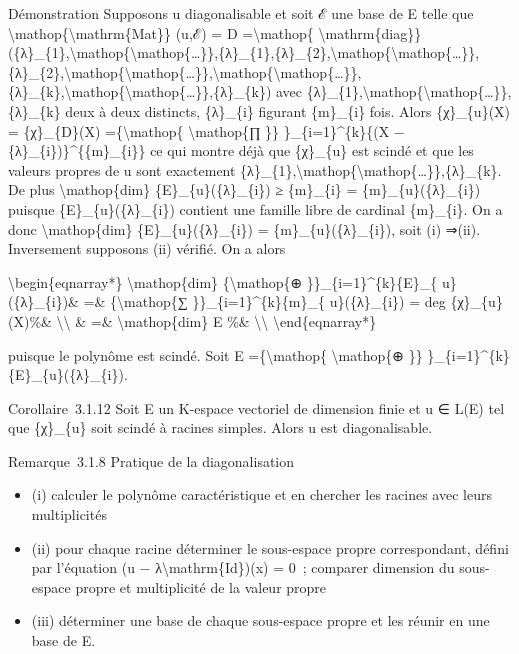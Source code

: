 \documentclass[]{article}
\begin{document}
Démonstration Supposons u diagonalisable et soit ℰ une base de E telle
que \textbackslash{}mathop\{\textbackslash{}mathrm\{Mat\}\} (u,ℰ) = D
=\textbackslash{}mathop\{
\textbackslash{}mathrm\{diag\}\}(\{λ\}\_\{1\},\textbackslash{}mathop\{\textbackslash{}mathop\{\ldots{}\}\},\{λ\}\_\{1\},\{λ\}\_\{2\},\textbackslash{}mathop\{\textbackslash{}mathop\{\ldots{}\}\},\{λ\}\_\{2\},\textbackslash{}mathop\{\textbackslash{}mathop\{\ldots{}\}\},\textbackslash{}mathop\{\textbackslash{}mathop\{\ldots{}\}\},\{λ\}\_\{k\},\textbackslash{}mathop\{\textbackslash{}mathop\{\ldots{}\}\},\{λ\}\_\{k\})
avec
\{λ\}\_\{1\},\textbackslash{}mathop\{\textbackslash{}mathop\{\ldots{}\}\},\{λ\}\_\{k\}
deux à deux distincts, \{λ\}\_\{i\} figurant \{m\}\_\{i\} fois. Alors
\{χ\}\_\{u\}(X) = \{χ\}\_\{D\}(X) =\{\textbackslash{}mathop\{
\textbackslash{}mathop\{∏ \}\} \}\_\{i=1\}\^{}\{k\}\{(X −
\{λ\}\_\{i\})\}\^{}\{\{m\}\_\{i\}\} ce qui montre déjà que \{χ\}\_\{u\}
est scindé et que les valeurs propres de u sont exactement
\{λ\}\_\{1\},\textbackslash{}mathop\{\textbackslash{}mathop\{\ldots{}\}\},\{λ\}\_\{k\}.
De plus \textbackslash{}mathop\{dim\} \{E\}\_\{u\}(\{λ\}\_\{i\}) ≥
\{m\}\_\{i\} = \{m\}\_\{u\}(\{λ\}\_\{i\}) puisque
\{E\}\_\{u\}(\{λ\}\_\{i\}) contient une famille libre de cardinal
\{m\}\_\{i\}. On a donc \textbackslash{}mathop\{dim\}
\{E\}\_\{u\}(\{λ\}\_\{i\}) = \{m\}\_\{u\}(\{λ\}\_\{i\}), soit (i) ⇒(ii).
Inversement supposons (ii) vérifié. On a alors

\textbackslash{}begin\{eqnarray*\} \textbackslash{}mathop\{dim\}
\{\textbackslash{}mathop\{⊕ \}\}\_\{i=1\}\^{}\{k\}\{E\}\_\{
u\}(\{λ\}\_\{i\})\& =\& \{\textbackslash{}mathop\{∑
\}\}\_\{i=1\}\^{}\{k\}\{m\}\_\{ u\}(\{λ\}\_\{i\}) = deg
\{χ\}\_\{u\}(X)\%\& \textbackslash{}\textbackslash{} \& =\&
\textbackslash{}mathop\{dim\} E \%\& \textbackslash{}\textbackslash{}
\textbackslash{}end\{eqnarray*\}

puisque le polynôme est scindé. Soit E =\{\textbackslash{}mathop\{
\textbackslash{}mathop\{⊕ \}\}
\}\_\{i=1\}\^{}\{k\}\{E\}\_\{u\}(\{λ\}\_\{i\}).

Corollaire~3.1.12 Soit E un K-espace vectoriel de dimension finie et u ∈
L(E) tel que \{χ\}\_\{u\} soit scindé à racines simples. Alors u est
diagonalisable.

Remarque~3.1.8 Pratique de la diagonalisation

\begin{itemize}
\itemsep1pt\parskip0pt
\item
  (i) calculer le polynôme caractéristique et en chercher les racines
  avec leurs multiplicités
\item
  (ii) pour chaque racine déterminer le sous-espace propre
  correspondant, défini par l'équation (u −
  λ\textbackslash{}mathrm\{Id\})(x) = 0~; comparer dimension du
  sous-espace propre et multiplicité de la valeur propre
\item
  (iii) déterminer une base de chaque sous-espace propre et les réunir
  en une base de E.
\end{itemize}
\end{document}
